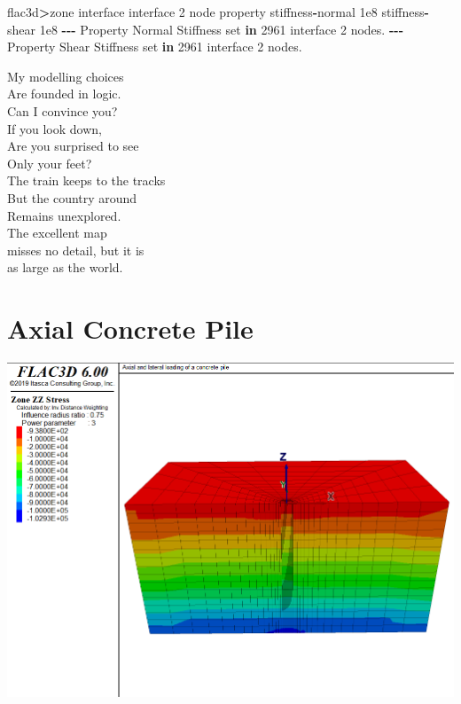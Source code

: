 \documentclass[a4paper, nobind]{templates/ociamthesis}
\newenvironment{Shaded}{\begin{snugshade}}{\end{snugshade}}
\newcommand{\BuiltInTok}[1]{#1}
\newcommand{\DecValTok}[1]{\textcolor[rgb]{0.00,0.00,0.81}{#1}}
\newcommand{\FloatTok}[1]{\textcolor[rgb]{0.00,0.00,0.81}{#1}}
\newcommand{\KeywordTok}[1]{\textcolor[rgb]{0.13,0.29,0.53}{\textbf{#1}}}
\newcommand{\NormalTok}[1]{#1}
\newcommand{\OperatorTok}[1]{\textcolor[rgb]{0.81,0.36,0.00}{\textbf{#1}}}
\newcommand{\StringTok}[1]{\textcolor[rgb]{0.31,0.60,0.02}{#1}}
\renewenvironment{Shaded}
{
  \vspace{10pt}%
  \begin{snugshade}%
}{%
  \end{snugshade}%
  \vspace{8pt}%
}
\begin{document}
\begin{Shaded}
\begin{Highlighting}[]
\NormalTok{flac3d}\OperatorTok{\textgreater{}}\NormalTok{zone interface }\StringTok{\textquotesingle{}interface 2\textquotesingle{}}\NormalTok{ node }\BuiltInTok{property}\NormalTok{ stiffness}\OperatorTok{{-}}\NormalTok{normal }\FloatTok{1e8}\NormalTok{ stiffness}\OperatorTok{{-}}\NormalTok{shear }\FloatTok{1e8}
\OperatorTok{{-}{-}{-}}\NormalTok{ Property Normal Stiffness }\BuiltInTok{set} \KeywordTok{in} \DecValTok{2961}\NormalTok{ interface }\DecValTok{2}\NormalTok{ nodes.}
\OperatorTok{{-}{-}{-}}\NormalTok{ Property Shear Stiffness }\BuiltInTok{set} \KeywordTok{in} \DecValTok{2961}\NormalTok{ interface }\DecValTok{2}\NormalTok{ nodes.}
\end{Highlighting}
\end{Shaded}

\newpage

\begin{savequote}
My modelling choices\\
Are founded in logic.\\
Can I convince you?\\
If you look down,\\
Are you surprised to see\\
Only your feet?\\
The train keeps to the tracks\\
But the country around\\
Remains unexplored.\\
The excellent map\\
misses no detail, but it is\\
as large as the world.
\end{savequote}

\hypertarget{axial-concrete-pile}{%
\chapter{Axial Concrete Pile}\label{axial-concrete-pile}}

\includegraphics[width=1\linewidth]{myfigureeeeee/h}
\end{document}
